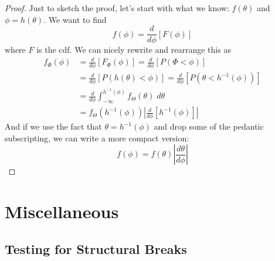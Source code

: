 \documentclass[12pt]{article}
\theoremstyle{plain}
\theoremstyle{definition}
\theoremstyle{remark}
\begin{document}
\begin{proof}
   Just to sketch the proof, let's start with what we know:
   $f(\theta)$ and $\phi = h(\theta)$. We want to find
      \[ f(\phi) = \frac{d}{d\phi} \left[ F(\phi) \right] \]
   where $F$ is the cdf. We can nicely rewrite and rearrange this as
   \begin{align*}
      f_\Phi(\phi) &= \frac{d}{d\phi}
      \left[ F_\Phi(\phi) \right] =
      \frac{d}{d\phi} \left[ P(\Phi < \phi ) \right]
      \\
      &= \frac{d}{d\phi} \left[ P( h(\theta) < \phi ) \right]
	 = \frac{d}{d\phi} \left[ P( \theta < h^{-1}(\phi) )  \right]
      \\ 
      &= \frac{d}{d\phi} \int^{h^{-1}(\phi)}_{-\infty}
	 f_\Theta(\theta)\; d\theta
      \\
      &= f_\Theta\left( h^{-1}(\phi) \right) \left\lvert
	 \frac{d}{d\phi} \left[ h^{-1}(\phi) \right] \right\rvert
   \end{align*}
And if we use the fact that $\theta = h^{-1}(\phi)$ and drop some of the
pedantic subscripting, we can write a more compact version:
   \[ f(\phi) = f(\theta) \left\lvert
      \frac{d\theta}{d\phi} \right\rvert\]

\end{proof}



\clearpage
\section{Miscellaneous}

\subsection{Testing for Structural Breaks}
\end{document}
